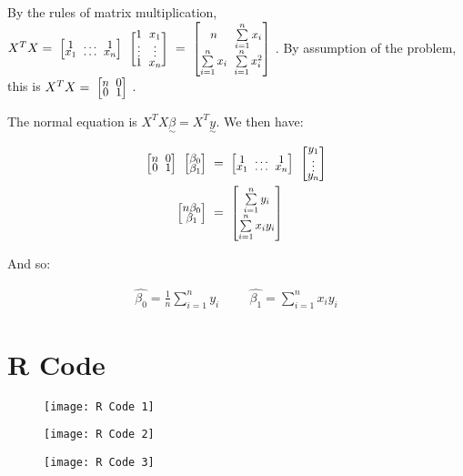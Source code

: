 \documentclass[12pt, letterpaper]{article}
\theoremstyle{definition}
\numberwithin{equation}{section}
\newcommand{\mymatrix}[1]{
	\renewcommand{\arraystretch}{0.5} 
	\setlength\arraycolsep{3pt}       
	\scalebox{0.90}{                  
		$\begin{bmatrix}
			#1
		\end{bmatrix}$
	}                   
	\renewcommand{\arraystretch}{1.0} 
	\setlength\arraycolsep{6pt}       
}
\newcommand{\+}[1]{+_{\scalebox{.375}{#1}}}
\newcommand{\1}{\mathbbm{1}}
\begin{document}
\vspace{\baselineskip}
\noindent\textbf{}
\vspace{\baselineskip}

By the rules of matrix multiplication, $X^TX=\mymatrix{1 & \dots &1\\x_1 & \dots &x_n}\mymatrix{1&x_1\\\vdots &\vdots \\ 1 &x_n}=\mymatrix{n & \sum\limits_{i=1}^{n}x_i\\\sum\limits_{i=1}^{n}x_i &\sum\limits_{i=1}^{n}x_i^2}$. By assumption of the problem, this is $X^TX=\mymatrix{n&0\\0&1}$.
\vspace{\baselineskip}

The normal equation is $X^TX \underset{\sim}{\beta}=X^T\underset{\sim}{y}$. We then have:

\begin{align*}
	\mymatrix{n&0\\0&1}\mymatrix{\beta_0\\\beta_1}&=\mymatrix{1 & \dots &1\\x_1 & \dots &x_n}\mymatrix{y_1 \\ \vdots \\ y_n}\\
	\mymatrix{n\beta_0\\\beta_1}&=\mymatrix{\sum\limits_{i=1}^{n}y_i\\\sum\limits_{i=1}^{n}x_iy_i}
\end{align*}

And so:

\begin{align*}
	\hat{\beta_0}=\frac{1}{n}\sum\limits_{i=1}^{n}y_i \hspace{1cm} \hat{\beta_1}=\sum\limits_{i=1}^{n}x_iy_i
\end{align*}


\newpage
\section*{R Code}

\begin{figure}[H]
	\centering
	\texttt{[image: R Code 1]}
\end{figure}
\begin{figure}[H]
	\centering
	\texttt{[image: R Code 2]}
\end{figure}
\begin{figure}[H]
	\centering
	\texttt{[image: R Code 3]}
\end{figure}
\end{document}
